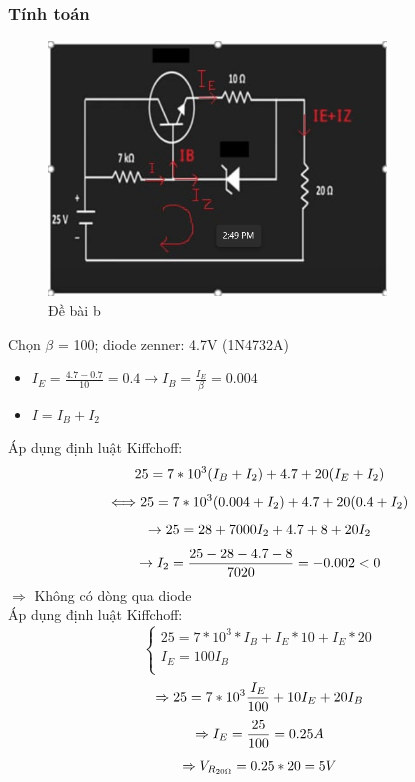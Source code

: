     \subsubsection{Tính toán}
    \begin{figure}[H]
        \centering
        \includegraphics[width=0.8\textwidth]{pictures/pic5_b.png}
        \caption{Đề bài b}
    \end{figure}
    Chọn $\beta$ = 100; diode zenner: 4.7V (1N4732A)
    \begin{itemize}
        \item $I_E = \frac{4.7 - 0.7}{10} = 0.4 \rightarrow I_B = \frac{I_E}{\beta} = 0.004$
        \item $I = I_B + I_2$
    \end{itemize}
    Áp dụng định luật Kiffchoff:
    \[
        25 = 7*10^3(I_B + I_2) + 4.7 + 20(I_E + I_2)\\
    \]
    \[
        \Longleftrightarrow 25 = 7*10^3(0.004 + I_2) + 4.7 + 20(0.4 + I_2) \\
    \]
    \[
        \rightarrow 25 = 28 + 7000I_2 + 4.7 + 8 + 20I_2 \\
    \]
    \[
        \rightarrow I_2 = \frac{25 - 28 - 4.7 - 8}{7020} = -0.002 < 0\\
    \]
    $\Rightarrow$ Không có dòng qua diode\\
    Áp dụng định luật Kiffchoff:
    \[
    \begin{cases}
        25 = 7*10^3*I_B + I_E*10 + I_E*20\\
        I_E = 100I_B\\
    \end{cases} 
    \]
    \[
    \Rightarrow 25 =7*10^3\frac{I_E}{100} + 10I_E + 20 I_B\\
    \]
    \[
    \Rightarrow I_E = \frac{25}{100} = 0.25 A\\
    \]
    \[
    \Rightarrow V_{R_{20\Omega }} = 0.25*20 = 5V\\
    \]
